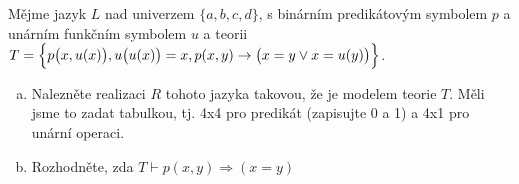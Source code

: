 Mějme jazyk $L$ nad univerzem $\{a, b, c, d\}$, s binárním
predikátovým symbolem $p$ a unárním funkčním symbolem $u$
a teorii $T = \Bigl\{ p\bigl(x,u(x)\bigr), u\bigl(u(x)\bigr)=x, p(x,y)
\rightarrow \bigl(x = y \vee x = u(y)\bigr) \Bigr\}$.  
\begin{enumerate}[a)]
  \item Nalezněte realizaci $R$ tohoto jazyka takovou, že je modelem teorie $T$. Měli jsme to zadat
tabulkou, tj. 4x4 pro predikát (zapisujte 0 a 1) a 4x1 pro unární operaci.
  \item Rozhodněte, zda $T \vdash p(x, y) \Rightarrow (x = y)$
\end{enumerate}
